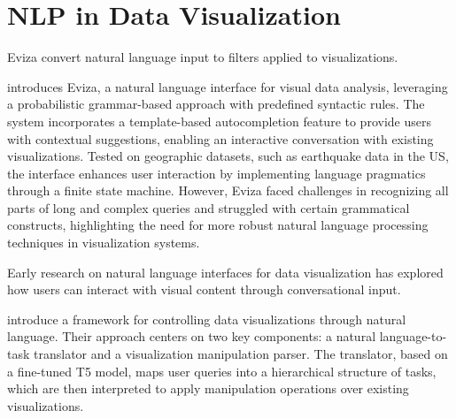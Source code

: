 




\section{NLP in Data Visualization}

Eviza \cite{Setlur2016Eviza} convert natural language input to filters applied to visualizations. 

\cite{Setlur2016Eviza} introduces Eviza, a natural language interface for visual data analysis, leveraging a probabilistic grammar-based approach with predefined syntactic rules. The system incorporates a template-based autocompletion feature to provide users with contextual suggestions, enabling an interactive conversation with existing visualizations. Tested on geographic datasets, such as earthquake data in the US, the interface enhances user interaction by implementing language pragmatics through a finite state machine. However, Eviza faced challenges in recognizing all parts of long and complex queries and struggled with certain grammatical constructs, highlighting the need for more robust natural language processing techniques in visualization systems.


\cite{Wu2024LLMVis}


Early research on natural language interfaces for data visualization has explored how users can interact with visual content through conversational input.

\cite{Liu2024NLDriven} introduce a framework for controlling data visualizations through natural language. Their approach centers on two key components: a natural language-to-task translator and a visualization manipulation parser. The translator, based on a fine-tuned T5 model, maps user queries into a hierarchical structure of tasks, which are then interpreted to apply manipulation operations over existing visualizations.


\cite{Luo2022NL2Vis}

